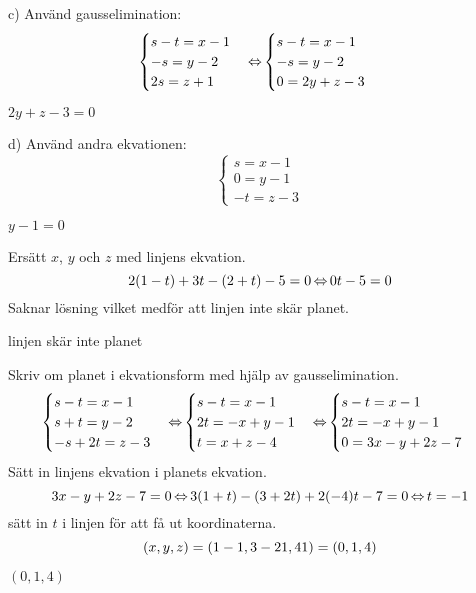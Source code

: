 \begin{task}{c)}
	Använd gausselimination:
	\[\begin{cases}
		s-t=x-1 \\
		-s=y-2 \\
		2s=z+1
	\end{cases} \operatorname{\Leftrightarrow}
	\begin{cases}
		s-t=x-1 \\
		-s=y-2 \\
		0=2y+z-3
	\end{cases}\]

	\ans $2y+z-3=0$
\end{task}

\begin{task}{d)}
	Använd andra ekvationen:
	\[\begin{cases}
		s=x-1 \\
		0=y-1 \\
		-t=z-3
	\end{cases}\]

	\ans $y-1=0$
\end{task}

\begin{task}{3.15}
	Ersätt $x$, $y$ och $z$ med linjens ekvation.
	\[2(1-t)+3t-(2+t)-5=0 \operatorname{\Leftrightarrow}
	0t-5=0\]
	Saknar lösning vilket medför att linjen inte skär planet.

	\ans linjen skär inte planet
\end{task}

\begin{task}{3.16}
	Skriv om planet i ekvationsform med hjälp av gausselimination.
	\[\begin{cases}
		s-t=x-1 \\
		s+t=y-2 \\
		-s+2t=z-3
	\end{cases} \operatorname{\Leftrightarrow}
	\begin{cases}
		s-t=x-1 \\
		2t=-x+y-1 \\
		t=x+z-4
	\end{cases} \operatorname{\Leftrightarrow}
	\begin{cases}
		s-t=x-1 \\
		2t=-x+y-1 \\
		0=3x-y+2z-7
	\end{cases}\]
	Sätt in linjens ekvation i planets ekvation.
	\[3x-y+2z-7=0 \lra
	3(1+t)-(3+2t)+2\*(-4)t-7=0 \lra
	t=-1\]
	sätt in $t$ i linjen för att få ut koordinaterna.
	\[(x,y,z)=(1-1,3-2\*1,4\*1)=(0,1,4)\]

	\ans $(0,1,4)$
\end{task}

